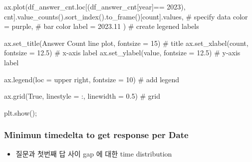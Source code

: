 \documentclass[
  letterpaper,
  DIV=11,
  numbers=noendperiod]{scrartcl}
\newenvironment{Shaded}{\begin{snugshade}}{\end{snugshade}}
\newcommand{\CommentTok}[1]{\textcolor[rgb]{0.37,0.37,0.37}{#1}}
\newcommand{\DecValTok}[1]{\textcolor[rgb]{0.68,0.00,0.00}{#1}}
\newcommand{\FloatTok}[1]{\textcolor[rgb]{0.68,0.00,0.00}{#1}}
\newcommand{\NormalTok}[1]{\textcolor[rgb]{0.00,0.23,0.31}{#1}}
\newcommand{\OperatorTok}[1]{\textcolor[rgb]{0.37,0.37,0.37}{#1}}
\newcommand{\StringTok}[1]{\textcolor[rgb]{0.13,0.47,0.30}{#1}}
\newcommand{\VariableTok}[1]{\textcolor[rgb]{0.07,0.07,0.07}{#1}}
\providecommand{\tightlist}{%
  \setlength{\itemsep}{0pt}\setlength{\parskip}{0pt}}\usepackage{longtable,booktabs,array}
\begin{document}
\begin{Shaded}
\begin{Highlighting}[]
\NormalTok{ax.plot(df\_answer\_cnt.loc[(df\_answer\_cnt[}\StringTok{\textquotesingle{}year\textquotesingle{}}\NormalTok{]}\OperatorTok{==} \StringTok{\textquotesingle{}2023\textquotesingle{}}\NormalTok{), }\StringTok{\textquotesingle{}cnt\textquotesingle{}}\NormalTok{].value\_counts().sort\_index().to\_frame()[}\StringTok{\textquotesingle{}count\textquotesingle{}}\NormalTok{].values, }\CommentTok{\# specify data}
\NormalTok{        color }\OperatorTok{=} \StringTok{\textquotesingle{}purple\textquotesingle{}}\NormalTok{, }\CommentTok{\# bar color}
\NormalTok{        label }\OperatorTok{=} \StringTok{\textquotesingle{}2023.11\textquotesingle{}}
\NormalTok{        ) }\CommentTok{\# create legened labels}





\NormalTok{ax.set\_title(}\StringTok{\textquotesingle{}Answer Count line plot\textquotesingle{}}\NormalTok{, fontsize }\OperatorTok{=} \DecValTok{15}\NormalTok{) }\CommentTok{\# title}
\NormalTok{ax.set\_xlabel(}\StringTok{\textquotesingle{}count\textquotesingle{}}\NormalTok{, fontsize }\OperatorTok{=} \FloatTok{12.5}\NormalTok{) }\CommentTok{\# x{-}axis label}
\NormalTok{ax.set\_ylabel(}\StringTok{\textquotesingle{}value\textquotesingle{}}\NormalTok{, fontsize }\OperatorTok{=} \FloatTok{12.5}\NormalTok{) }\CommentTok{\# y{-}axis label}

\NormalTok{ax.legend(loc }\OperatorTok{=} \StringTok{\textquotesingle{}upper right\textquotesingle{}}\NormalTok{, fontsize }\OperatorTok{=} \DecValTok{10}\NormalTok{) }\CommentTok{\# add legend}

\NormalTok{ax.grid(}\VariableTok{True}\NormalTok{, linestyle }\OperatorTok{=} \StringTok{\textquotesingle{}:\textquotesingle{}}\NormalTok{, linewidth }\OperatorTok{=} \FloatTok{0.5}\NormalTok{) }\CommentTok{\# grid}

\NormalTok{plt.show()}\OperatorTok{;}
\end{Highlighting}
\end{Shaded}

\subsubsection{Minimun timedelta to get response per
Date}\label{minimun-timedelta-to-get-response-per-date}

\begin{itemize}
\tightlist
\item
  질문과 첫번째 답 사이 gap 에 대한 time distribution
\end{itemize}
\end{document}
